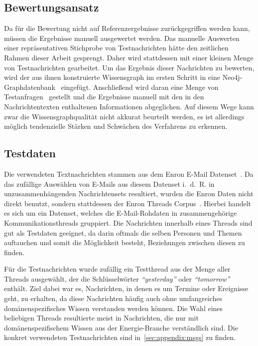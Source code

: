 \subsection{Bewertungsansatz}%
\label{sec:evaluation:quality:method}

Da für die Bewertung nicht auf Referenzergebnisse zurückgegriffen werden kann, müssen die Ergebnisse manuell ausgewertet werden.
Das manuelle Auswerten einer repräsentativen Stichprobe von Testnachrichten hätte den zeitlichen Rahmen dieser Arbeit gesprengt.
Daher wird stattdessen mit einer kleinen Menge von Testnachrichten gearbeitet.
Um das Ergebnis dieser Nachrichten zu bewerten, wird der aus ihnen konstruierte Wissensgraph im ersten Schritt in eine Neo4j-Graphdatenbank~\cite{Neo4j} eingefügt.
Anschließend wird daran eine Menge von Testanfragen~ gestellt und die Ergebnisse manuell mit den in den Nachrichtentexten enthaltenen Informationen abgeglichen.
Auf diesem Wege kann zwar die Wissensgraphqualität nicht akkurat beurteilt werden, es ist allerdings möglich tendenzielle Stärken und Schwächen des Verfahrens zu erkennen.

\subsection{Testdaten}%
\label{sec:evaluation:quality:data}

Die verwendeten Textnachrichten stammen aus dem Enron E-Mail Datenset~\cite{Cohen2015}.
Da das zufällige Auswählen von E-Mails aus diesem Datenset i.~d.~R. in unzusammenhängenden Nachrichtensets resultiert, wurden die Enron Daten nicht direkt benutzt, sondern stattdessen der Enron Threads Corpus~\cite{Jamison2013}\cite{EnronThreads}.
Hierbei handelt es sich um ein Datenset, welches die E-Mail-Rohdaten in zusammengehörige Kommunikationsthreads gruppiert.
Die Nachrichten innerhalb eines Threads sind gut als Testdaten geeignet, da darin oftmals die selben Personen und Themen auftauchen und somit die Möglichkeit besteht, Beziehungen zwischen diesen zu finden.

Für die Testnachrichten wurde zufällig ein Testthread aus der Menge aller Threads ausgewählt, der die Schlüsselwörter \textit{``yesterday''} oder \textit{``tomorrow''} enthält.
Ziel dabei war es, Nachrichten, in denen es um Termine oder Ereignisse geht, zu erhalten, da diese Nachrichten häufig auch ohne umfangreiches domänenspezifisches Wissen verstanden werden können.
Die Wahl eines beliebigen Threads resultierte meist in Nachrichten, die nur mit domänenspezifischem Wissen aus der Energie-Branche verständlich sind.
Die konkret verwendeten Testnachrichten sind in~\ref{sec:appendix:msgs} zu finden.

